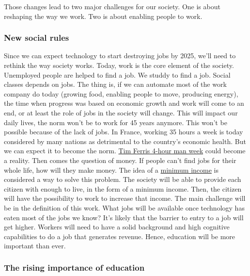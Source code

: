 \documentclass[12pt]{article}
\begin{document}
{Those changes lead to two major challenges for our society. One is about reshaping the way we work. Two is about enabling people to work.

\subsubsection{New social rules}

Since we can expect technology to start destroying jobs by 2025, we'll need to rethink the way society works. Today, work is the core element of the society. Unemployed people are helped to find a job. We studdy to find a job. Social classes depends on jobs.
The thing is, if we can automate most of the work company do today (growing food, enabling people to move, producing energy), the time when progress was based on economic growth and work will come to an end, or at least the role of jobs in the society will change.
This will impact our daily lives, the norm won't be to work for 45 years anymore. This won't be possible because of the lack of jobs. In France, working 35 hours a week is today considered by many nations as detrimental to the country's economic health. But we can expect it to become the norm. \href{http://fourhourworkweek.com/}{Tim Ferris 4-hour man week} could become a reality.
Then comes the question of money. If people can't find jobs for their whole life, how will they make money. The idea of a \href{http://www.globalresearch.ca/an-unconditional-citizens-income-a-basic-guaranteed-minimum-income/5423130}{minimum income} is considered a way to solve this problem. The society will be able to provide each citizen with enough to live, in the form of a minimum income. Then, the citizen will have the possibility to work to increase that income.
The main challenge will be in the definition of this work. What jobs will be available once technology has eaten most of the jobs we know? It's likely that the barrier to entry to a job will get higher. Workers will need to have a solid background and high cognitive capabilities to do a job that generates revenue. Hence, education will be more important than ever.

\subsubsection{The rising importance of education}

}
\end{document}

